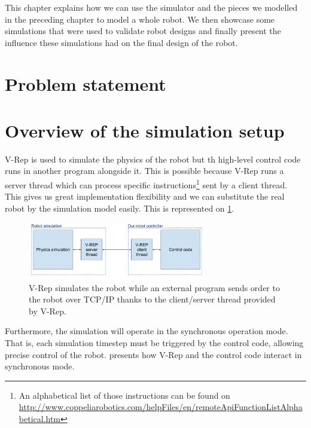 This chapter explains how we can use the simulator and the pieces we modelled in the preceding chapter to model a whole robot. We then showcase some simulations that were used to validate robot designs and finally present the influence these simulations had on the final design of the robot. 

\section{Problem statement}

\section{Overview of the simulation setup}
V-Rep is used to simulate the physics of the robot but th high-level control code runs in another program alongside it. This is possible because V-Rep runs a server thread which can process specific instructions\footnote{An alphabetical list of those instructions can be found on \url{http://www.coppeliarobotics.com/helpFiles/en/remoteApiFunctionListAlphabetical.htm}} sent by a client thread. This gives us great implementation flexibility and we can substitute the real robot by the simulation model easily. This is represented on \cref{fig:simulation_principles}.

\begin{figure}[htp]
\centering
\includegraphics[width=0.7\textwidth]{figures/simulation_principles}
\caption[Simulation principles]{V-Rep simulates the robot while an external program sends order to the robot over TCP/IP thanks to the client/server thread provided by V-Rep.}
\label{fig:simulation_principles}
\end{figure}

Furthermore, the simulation will operate in the synchronous operation mode. That is, each simulation timestep must be triggered by the control code, allowing precise control of the robot.  presents how V-Rep and the control code interact in synchronous mode.

